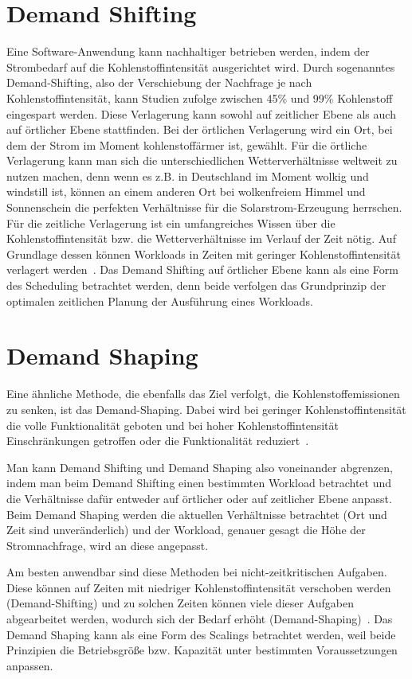 \section{Demand Shifting}
Eine Software-Anwendung kann nachhaltiger betrieben werden, indem der Strombedarf auf die Kohlenstoffintensität ausgerichtet wird.
Durch sogenanntes Demand-Shifting, also der Verschiebung der Nachfrage je nach Kohlenstoffintensität, kann Studien zufolge zwischen 45\% und 99\% Kohlenstoff eingespart werden.
Diese Verlagerung kann sowohl auf zeitlicher Ebene als auch auf örtlicher Ebene stattfinden.
Bei der örtlichen Verlagerung wird ein Ort, bei dem der Strom im Moment kohlenstoffärmer ist, gewählt.
Für die örtliche Verlagerung kann man sich die unterschiedlichen Wetterverhältnisse weltweit zu nutzen machen, denn wenn es z.B. in Deutschland im Moment wolkig und windstill ist, können an einem anderen Ort bei wolkenfreiem Himmel und Sonnenschein die perfekten Verhältnisse für die Solarstrom-Erzeugung herrschen.
Für die zeitliche Verlagerung ist ein umfangreiches Wissen über die Kohlenstoffintensität bzw. die Wetterverhältnisse im Verlauf der Zeit nötig.
Auf Grundlage dessen können Workloads in Zeiten mit geringer Kohlenstoffintensität verlagert werden~\cite{GreenSoftwareFoundation.2022}.
Das Demand Shifting auf örtlicher Ebene kann als eine Form des Scheduling betrachtet werden, denn beide verfolgen das Grundprinzip der optimalen zeitlichen Planung der Ausführung eines Workloads.

\section{Demand Shaping}
Eine ähnliche Methode, die ebenfalls das Ziel verfolgt, die Kohlenstoffemissionen zu senken, ist das Demand-Shaping.
Dabei wird bei geringer Kohlenstoffintensität die volle Funktionalität geboten und bei hoher Kohlenstoffintensität Einschränkungen getroffen oder die Funktionalität reduziert~\cite{Currie.2024}.

Man kann Demand Shifting und Demand Shaping also voneinander abgrenzen, indem man beim Demand Shifting einen bestimmten Workload betrachtet und die Verhältnisse dafür entweder auf örtlicher oder auf zeitlicher Ebene anpasst.
Beim Demand Shaping werden die aktuellen Verhältnisse betrachtet (Ort und Zeit sind unveränderlich) und der Workload, genauer gesagt die Höhe der Stromnachfrage, wird an diese angepasst.

Am besten anwendbar sind diese Methoden bei nicht-zeitkritischen Aufgaben.
Diese können auf Zeiten mit niedriger Kohlenstoffintensität verschoben werden (Demand-Shifting) und zu solchen Zeiten können viele dieser Aufgaben abgearbeitet werden, wodurch sich der Bedarf erhöht (Demand-Shaping)~\cite{Currie.2024}.
Das Demand Shaping kann als eine Form des Scalings betrachtet werden, weil beide Prinzipien die Betriebsgröße bzw. Kapazität unter bestimmten Voraussetzungen anpassen.

